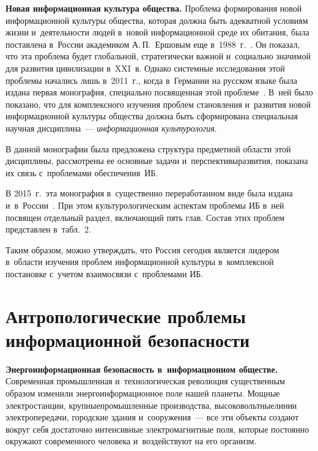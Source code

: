 \begin{multicols}{2}
     \textbf{Новая информационная культура общества.} Проб\-ле\-ма 
формирования новой информационной культуры общества, которая должна 
быть адекватной условиям жизни и~деятельности людей в~новой 
информационной среде их обитания, была по\-став\-ле\-на в~России академиком 
А.\,П.~Ершовым еще в~1988~г.~\cite{26-kol}. Он показал, что эта проблема 
будет глобальной, стратегически важной и~социально значимой для развития 
цивилизации в~XXI~в. Однако системные исследования этой проблемы 
начались лишь в~2011~г., когда в~Германии на русском языке была издана 
первая монография, специально посвященная этой проблеме~\cite{27-kol}. 
В~ней было показано, что для комплексного изучения проблем становления 
и~развития новой информационной культуры общества должна быть 
сформирована специальная научная дисциплина~--- \textit{информационная 
культурология}.
     
     В данной монографии была предложена структура предметной об\-ласти 
этой дисциплины, рассмотрены ее основные задачи и~перспективы\linebreak  развития, 
показана их связь с~проблемами обеспечения~ИБ.
     
     В 2015~г.\ эта монография в~существенно переработанном виде была 
издана и~в~России~\cite{28-kol}. При этом культурологическим аспектам 
проблемы ИБ в~ней посвящен отдельный раздел, 
вклю\-ча\-ющий пять глав. Состав этих проблем представлен в~табл.~2. 
     
     Таким образом, можно утверждать, что Россия сегодня является 
лидером в~об\-ласти изучения проб\-лем информационной культуры 
в~комплексной постановке с~учетом взаимосвязи с~проблемами 
ИБ.



     
\section{Антропологические проблемы информационной 
безопасности}



    \textbf{Энергоинформационная безопасность в~информационном 
обществе.} Современная промышленная и~технологическая революция 
существенным образом изменили энергоинформационное поле нашей 
планеты. Мощные электростанции, крупные\linebreak промышленные производства, 
высоковольтные\linebreak линии электропередачи, городские здания и~сооружения~--- 
все эти объекты создают вокруг себя достаточно интенсивные 
электромагнитные поля, которые постоянно окружают современного 
человека и~воздействуют на его организм. 
    

\end{multicols}
